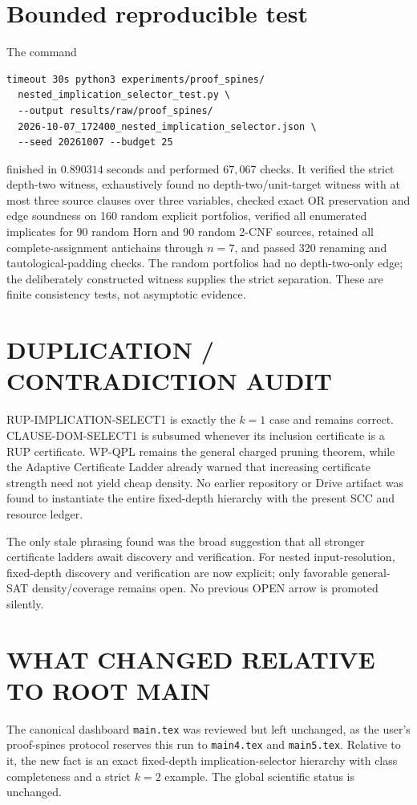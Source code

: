 \documentclass[11pt]{article}
\begin{document}
\section*{Bounded reproducible test}
The command
\begin{verbatim}
timeout 30s python3 experiments/proof_spines/
  nested_implication_selector_test.py \
  --output results/raw/proof_spines/
  2026-10-07_172400_nested_implication_selector.json \
  --seed 20261007 --budget 25
\end{verbatim}
finished in $0.890314$ seconds and performed $67{,}067$ checks.  It verified
the strict depth-two witness, exhaustively found no depth-two/unit-target
witness with at most three source clauses over three variables, checked exact
OR preservation and edge soundness on 160 random explicit portfolios,
verified all enumerated implicates for 90 random Horn and 90 random 2-CNF
sources, retained all complete-assignment antichains through $n=7$, and
passed 320 renaming and tautological-padding checks.  The random portfolios
had no depth-two-only edge; the deliberately constructed witness supplies the
strict separation.  These are finite consistency tests, not asymptotic
evidence.

\section*{DUPLICATION / CONTRADICTION AUDIT}
RUP-IMPLICATION-SELECT1 is exactly the $k=1$ case and remains correct.
CLAUSE-DOM-SELECT1 is subsumed whenever its inclusion certificate is a RUP
certificate.  WP-QPL remains the general charged pruning theorem, while the
Adaptive Certificate Ladder already warned that increasing certificate
strength need not yield cheap density.  No earlier repository or Drive
artifact was found to instantiate the entire fixed-depth hierarchy with the
present SCC and resource ledger.

The only stale phrasing found was the broad suggestion that all stronger
certificate ladders await discovery and verification.  For nested
input-resolution, fixed-depth discovery and verification are now explicit;
only favorable general-SAT density/coverage remains open.  No previous OPEN
arrow is promoted silently.

\section*{WHAT CHANGED RELATIVE TO ROOT MAIN}
The canonical dashboard \texttt{main.tex} was reviewed but left unchanged,
as the user's proof-spines protocol reserves this run to \texttt{main4.tex}
and \texttt{main5.tex}.  Relative to it, the new fact is an exact
fixed-depth implication-selector hierarchy with class completeness and a
strict $k=2$ example.  The global scientific status is unchanged.
\end{document}
